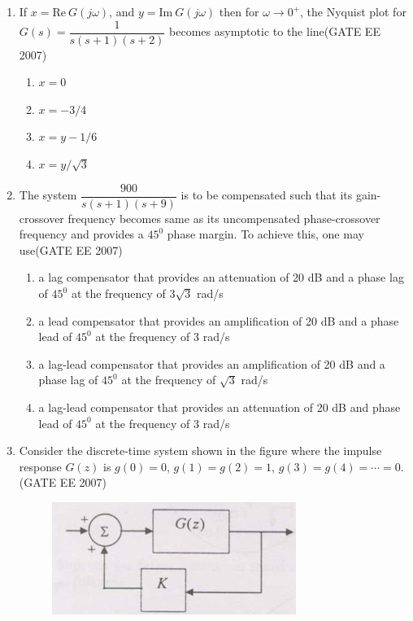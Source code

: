 \documentclass[a4paper,10pt]{exam}
\theoremstyle{remark}
\begin{document}
\begin{enumerate}
\item  \quad If $x = \text{Re}\ G(j\omega)$, and $y = \text{Im}\ G(j\omega)$ then for $\omega \to 0^{+}$, the Nyquist plot for\\
$G(s) = \dfrac{1}{s(s+1)(s+2)}$ becomes asymptotic to the line\hfill{(GATE EE 2007)} 

\begin{multicols}{4}
\begin{enumerate}
\item  $x = 0$
\item  $x = -3/4$
\item  $x = y - 1/6$
\item  $x = y/\sqrt{3}$
\end{enumerate}
\end{multicols}


\vfill
{}
\newpage

\item  \quad The system $\dfrac{900}{s(s+1)(s+9)}$ is to be compensated such that its gain-crossover frequency becomes same as its uncompensated phase-crossover frequency and provides a $45^{0}$ phase margin. To achieve this, one may use\hfill{(GATE EE 2007)} 

\begin{enumerate}
    \item a lag compensator that provides an attenuation of 20 dB and a phase lag of $45^{0}$ at the frequency of $3\sqrt{3}$ rad/s
    \item a lead compensator that provides an amplification of 20 dB and a phase lead of $45^{0}$ at the frequency of 3 rad/s
    \item a lag-lead compensator that provides an amplification of 20 dB and a phase lag of $45^{0}$ at the frequency of $\sqrt{3}$ rad/s
    \item a lag-lead compensator that provides an attenuation of 20 dB and phase lead of $45^{0}$ at the frequency of 3 rad/s
\end{enumerate}

\item  \quad Consider the discrete-time system shown in the figure where the impulse response $G(z)$ is $g(0) = 0$, $g(1) = g(2) = 1$, $g(3) = g(4) = \cdots = 0$. \hfill{(GATE EE 2007)} 

\begin{figure}[H]
    \centering
    \includegraphics[width=0.4\linewidth]{figs/q 36 2007.png} 
\caption{}
    \label{fig:myfigure}
\end{figure}


\end{enumerate}
\end{document}
